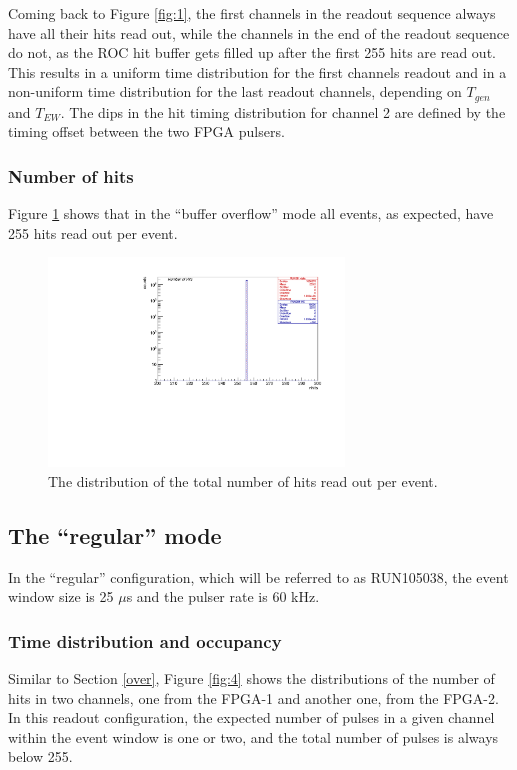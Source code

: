 Coming back to Figure \ref{fig:1}, the first channels in the readout sequence
always have all their hits read out,
while the channels in the end of the readout sequence do not,
as the ROC hit buffer gets filled up after
the first 255 hits are read out.
This results in a uniform time distribution for the first channels readout and in a non-uniform
time distribution for the last readout channels, depending on $T_{gen}$ and $T_{EW}$.
The dips in the hit timing distribution for channel 2 are defined by the timing offset
between the two FPGA pulsers. 


\subsubsection{Number of hits}
Figure \ref{fig:3} shows that in the ``buffer overflow'' mode all events,
as expected, have 255 hits read out per event.

\begin{figure}[!h]
\centering
\includegraphics[width =0.7\textwidth]{figures/pdf/figure_00008_nhits_281.pdf}
\caption{
  The distribution of the total number of hits read out per event.
}
\label{fig:3}
\end{figure}
\subsection{The ``regular'' mode }
In the ``regular'' configuration, which will be referred to as RUN105038, the event window size is 25 $\mu$s
and the pulser rate is 60 kHz.

\subsubsection{Time distribution and occupancy}

Similar to Section \ref{over}, Figure \ref{fig:4} shows the distributions
of the number of hits in two channels, one from the 
FPGA-1 and another one, from the FPGA-2. 
In this readout configuration, the expected number of pulses in a given channel
within the event window is one or two, and the total number of pulses is always below 255.

